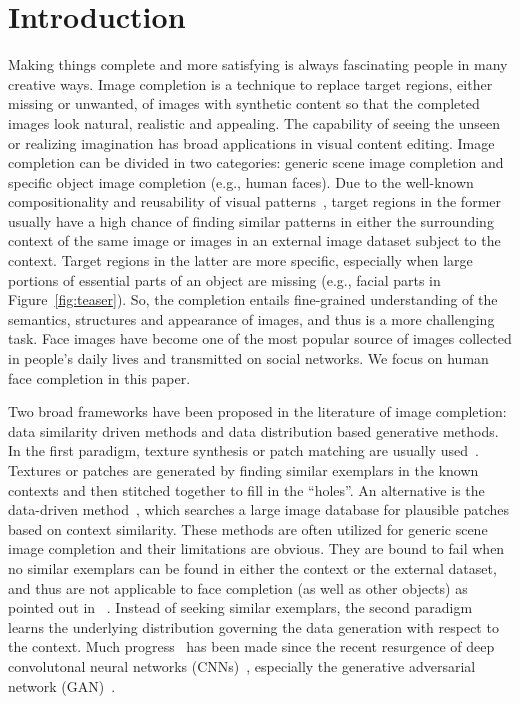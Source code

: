 \documentclass[acmtog,timestamp]{acmart}
\begin{document}
\section{Introduction}
Making things complete and more satisfying is always fascinating people in many creative ways. Image completion is a technique to replace target regions, either missing or unwanted, of images with synthetic content so that the completed images look natural, realistic and  appealing. The capability of seeing the unseen or realizing imagination has broad applications in visual content editing. 
Image completion can be divided in two categories: generic scene image completion and specific object image completion (e.g., human faces). Due to the well-known compositionality and reusability of visual patterns~\cite{geman2002composition}, target regions in the former usually have a high chance of finding similar patterns in either the surrounding context of the same image or images in an external image dataset subject to the context. Target regions in the latter are more specific, especially when large portions of essential
parts of an object are missing (e.g., facial parts in Figure~\ref{fig:teaser}). So, the completion entails  fine-grained understanding of the semantics, structures and appearance of images, and thus is a more challenging task. Face images have become one of the most popular source of images collected in people's daily lives and transmitted on social networks. We focus on human face completion in this paper.  

Two broad frameworks have been proposed in the literature of image completion: data similarity driven methods and data distribution based generative methods. In the first paradigm, texture synthesis or patch matching are usually used~\cite{efros1999texture,kwatra2003graphcut,criminisi2003object,wilczkowiak2005hole,komodakis2006image,barnes2009patchmatch,darabi2012image,huang2014image,wexler2007space}. Textures or patches are generated by finding similar exemplars in the known contexts and then stitched together to fill in the ``holes''. An alternative is the data-driven method~\cite{hays2007scene}, which searches a large image database for plausible patches based on context similarity. These methods are often utilized for generic scene image completion and their limitations are obvious. They are bound to fail when no similar exemplars can be found in either the context or the external dataset, and thus are not applicable to face completion (as well as other objects) as pointed out in ~\cite{iizuka2017globally,yeh2017semantic}. Instead of seeking similar exemplars, the second paradigm learns the underlying distribution governing the data generation with respect to the context. Much progress~\cite{li2017generative,yeh2017semantic,yang2016high,iizuka2017globally,denton2016semi,pathak2016context} has been made since the recent resurgence of deep convolutonal neural networks (CNNs)~\cite{cnn,AlexNet}, especially the generative adversarial network (GAN)~\cite{goodfellow2014generative}. 
\end{document}
